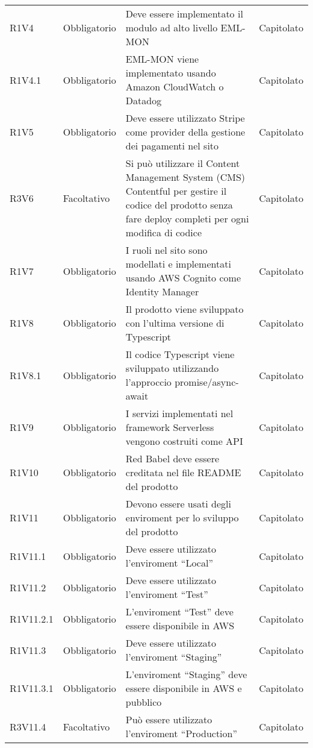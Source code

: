 {\begin{longtable}{C{2.5cm} C{2.8cm} C{6.7cm} C{2.5cm}}
R1V4 & Obbligatorio & Deve essere implementato il modulo ad alto livello EML-MON & Capitolato \\
R1V4.1 & Obbligatorio & EML-MON viene implementato usando Amazon CloudWatch o  Datadog & Capitolato \\

R1V5 & Obbligatorio & Deve essere utilizzato Stripe come provider della gestione dei pagamenti nel sito & Capitolato \\

R3V6 & Facoltativo & Si può utilizzare il Content Management System (CMS) Contentful per gestire il codice del prodotto senza fare deploy completi per ogni modifica di codice & Capitolato \\

R1V7 & Obbligatorio & I ruoli nel sito sono modellati e implementati usando AWS Cognito come Identity Manager & Capitolato \\

R1V8 & Obbligatorio & Il prodotto viene sviluppato con l'ultima versione di Typescript & Capitolato \\
R1V8.1 & Obbligatorio & Il codice Typescript viene sviluppato utilizzando l'approccio promise/async-await & Capitolato \\

R1V9 & Obbligatorio & I servizi implementati nel framework Serverless vengono costruiti come API & Capitolato \\

R1V10 & Obbligatorio & Red Babel deve essere creditata nel file README del prodotto & Capitolato \\

R1V11 & Obbligatorio & Devono essere usati degli enviroment per lo sviluppo del prodotto & Capitolato \\
R1V11.1 & Obbligatorio & Deve essere utilizzato l'enviroment ``Local'' & Capitolato \\
R1V11.2 & Obbligatorio & Deve essere utilizzato l'enviroment ``Test'' & Capitolato \\
R1V11.2.1 & Obbligatorio & L'enviroment ``Test'' deve essere disponibile in AWS & Capitolato \\
R1V11.3 & Obbligatorio & Deve essere utilizzato l'enviroment ``Staging'' & Capitolato \\
R1V11.3.1 & Obbligatorio & L'enviroment ``Staging'' deve essere disponibile in AWS e pubblico & Capitolato \\
R3V11.4 & Facoltativo & Può essere utilizzato l'enviroment ``Production'' & Capitolato \\


\end{longtable}}
